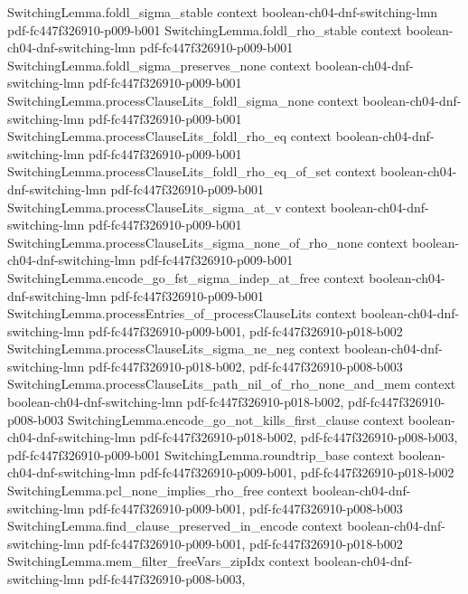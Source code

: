 \begin{theorem}
\proofstep
  {SwitchingLemma.foldl_sigma_stable}
  {context}
  {boolean-ch04-dnf-switching-lmn}
  {pdf-fc447f326910-p009-b001}
\proofstep
  {SwitchingLemma.foldl_rho_stable}
  {context}
  {boolean-ch04-dnf-switching-lmn}
  {pdf-fc447f326910-p009-b001}
\proofstep
  {SwitchingLemma.foldl_sigma_preserves_none}
  {context}
  {boolean-ch04-dnf-switching-lmn}
  {pdf-fc447f326910-p009-b001}
\proofstep
  {SwitchingLemma.processClauseLits_foldl_sigma_none}
  {context}
  {boolean-ch04-dnf-switching-lmn}
  {pdf-fc447f326910-p009-b001}
\proofstep
  {SwitchingLemma.processClauseLits_foldl_rho_eq}
  {context}
  {boolean-ch04-dnf-switching-lmn}
  {pdf-fc447f326910-p009-b001}
\proofstep
  {SwitchingLemma.processClauseLits_foldl_rho_eq_of_set}
  {context}
  {boolean-ch04-dnf-switching-lmn}
  {pdf-fc447f326910-p009-b001}
\proofstep
  {SwitchingLemma.processClauseLits_sigma_at_v}
  {context}
  {boolean-ch04-dnf-switching-lmn}
  {pdf-fc447f326910-p009-b001}
\proofstep
  {SwitchingLemma.processClauseLits_sigma_none_of_rho_none}
  {context}
  {boolean-ch04-dnf-switching-lmn}
  {pdf-fc447f326910-p009-b001}
\proofstep
  {SwitchingLemma.encode_go_fst_sigma_indep_at_free}
  {context}
  {boolean-ch04-dnf-switching-lmn}
  {pdf-fc447f326910-p009-b001}
\proofstep
  {SwitchingLemma.processEntries_of_processClauseLits}
  {context}
  {boolean-ch04-dnf-switching-lmn}
  {pdf-fc447f326910-p009-b001,
    pdf-fc447f326910-p018-b002}
\proofstep
  {SwitchingLemma.processClauseLits_sigma_ne_neg}
  {context}
  {boolean-ch04-dnf-switching-lmn}
  {pdf-fc447f326910-p018-b002,
    pdf-fc447f326910-p008-b003}
\proofstep
  {SwitchingLemma.processClauseLits_path_nil_of_rho_none_and_mem}
  {context}
  {boolean-ch04-dnf-switching-lmn}
  {pdf-fc447f326910-p018-b002,
    pdf-fc447f326910-p008-b003}
\proofstep
  {SwitchingLemma.encode_go_not_kills_first_clause}
  {context}
  {boolean-ch04-dnf-switching-lmn}
  {pdf-fc447f326910-p018-b002,
    pdf-fc447f326910-p008-b003,
    pdf-fc447f326910-p009-b001}
\proofstep
  {SwitchingLemma.roundtrip_base}
  {context}
  {boolean-ch04-dnf-switching-lmn}
  {pdf-fc447f326910-p009-b001,
    pdf-fc447f326910-p018-b002}
\proofstep
  {SwitchingLemma.pcl_none_implies_rho_free}
  {context}
  {boolean-ch04-dnf-switching-lmn}
  {pdf-fc447f326910-p009-b001,
    pdf-fc447f326910-p008-b003}
\proofstep
  {SwitchingLemma.find_clause_preserved_in_encode}
  {context}
  {boolean-ch04-dnf-switching-lmn}
  {pdf-fc447f326910-p009-b001,
    pdf-fc447f326910-p018-b002}
\proofstep
  {SwitchingLemma.mem_filter_freeVars_zipIdx}
  {context}
  {boolean-ch04-dnf-switching-lmn}
  {pdf-fc447f326910-p008-b003,
}
\end{theorem}
